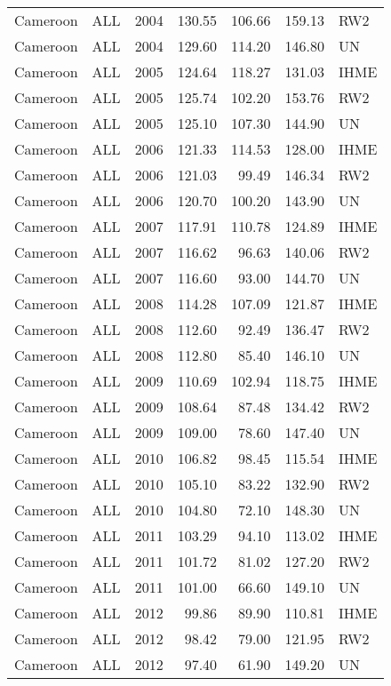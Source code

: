 \begin{longtable}{lllrrrl}
  Cameroon & ALL & 2004 & 130.55 & 106.66 & 159.13 & RW2 \\ 
  Cameroon & ALL & 2004 & 129.60 & 114.20 & 146.80 & UN \\ 
  Cameroon & ALL & 2005 & 124.64 & 118.27 & 131.03 & IHME \\ 
  Cameroon & ALL & 2005 & 125.74 & 102.20 & 153.76 & RW2 \\ 
  Cameroon & ALL & 2005 & 125.10 & 107.30 & 144.90 & UN \\ 
  Cameroon & ALL & 2006 & 121.33 & 114.53 & 128.00 & IHME \\ 
  Cameroon & ALL & 2006 & 121.03 & 99.49 & 146.34 & RW2 \\ 
  Cameroon & ALL & 2006 & 120.70 & 100.20 & 143.90 & UN \\ 
  Cameroon & ALL & 2007 & 117.91 & 110.78 & 124.89 & IHME \\ 
  Cameroon & ALL & 2007 & 116.62 & 96.63 & 140.06 & RW2 \\ 
  Cameroon & ALL & 2007 & 116.60 & 93.00 & 144.70 & UN \\ 
  Cameroon & ALL & 2008 & 114.28 & 107.09 & 121.87 & IHME \\ 
  Cameroon & ALL & 2008 & 112.60 & 92.49 & 136.47 & RW2 \\ 
  Cameroon & ALL & 2008 & 112.80 & 85.40 & 146.10 & UN \\ 
  Cameroon & ALL & 2009 & 110.69 & 102.94 & 118.75 & IHME \\ 
  Cameroon & ALL & 2009 & 108.64 & 87.48 & 134.42 & RW2 \\ 
  Cameroon & ALL & 2009 & 109.00 & 78.60 & 147.40 & UN \\ 
  Cameroon & ALL & 2010 & 106.82 & 98.45 & 115.54 & IHME \\ 
  Cameroon & ALL & 2010 & 105.10 & 83.22 & 132.90 & RW2 \\ 
  Cameroon & ALL & 2010 & 104.80 & 72.10 & 148.30 & UN \\ 
  Cameroon & ALL & 2011 & 103.29 & 94.10 & 113.02 & IHME \\ 
  Cameroon & ALL & 2011 & 101.72 & 81.02 & 127.20 & RW2 \\ 
  Cameroon & ALL & 2011 & 101.00 & 66.60 & 149.10 & UN \\ 
  Cameroon & ALL & 2012 & 99.86 & 89.90 & 110.81 & IHME \\ 
  Cameroon & ALL & 2012 & 98.42 & 79.00 & 121.95 & RW2 \\ 
  Cameroon & ALL & 2012 & 97.40 & 61.90 & 149.20 & UN \\ 

\end{longtable}
